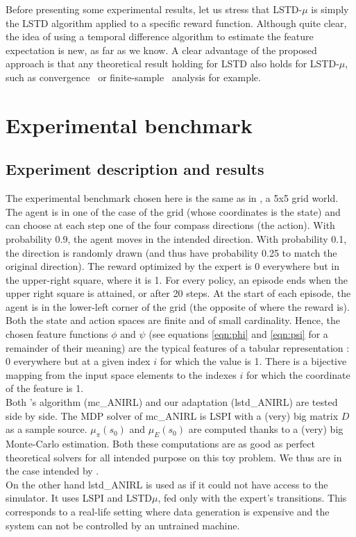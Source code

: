\documentclass{article}
\begin{document}
Before presenting some experimental results, let us stress that
LSTD-$\mu$ is simply the LSTD algorithm applied to a specific reward
function. Although quite clear, the idea of using a temporal
difference algorithm to estimate the feature expectation is new, as
far as we know. A clear advantage of the proposed approach is that
any theoretical result holding for LSTD also holds for LSTD-$\mu$,
such as convergence~\citep{nedic2003least} or
finite-sample~\citep{lazaric2010finiteLSTD} analysis for example.

\section{Experimental benchmark}
\label{sec:exp}
\subsection{Experiment description and results}
The experimental benchmark chosen here is the same as in \citep{ng2000algorithms}, a 5x5 grid world. The agent is in one of the case of the grid (whose coordinates is the state) and can choose at each step one of the four compass directions (the action). With probability 0.9, the agent moves in the intended direction. With probability 0.1, the direction is randomly drawn (and thus have probability 0.25 to match the original direction). The reward optimized by the expert is 0 everywhere but in the upper-right square, where it is 1. For every policy, an episode ends when the upper right square is attained, or after 20 steps. At the start of each episode, the agent is in the lower-left corner of the grid (the opposite of where the reward is).\\

Both the state and action spaces are finite and of small cardinality. Hence, the chosen feature functions $\phi$ and $\psi$ (see equations \ref{eqn:phi} and \ref{eqn:psi} for a remainder of their meaning) are the typical features of a tabular representation : 0 everywhere but at a given index $i$ for which the value is 1. There is a bijective mapping from the input space elements to the indexes $i$ for which the coordinate of the feature is 1.\\

Both \citet{abbeel2004apprenticeship}'s algorithm (mc\_ANIRL) and our adaptation (lstd\_ANIRL) are tested side by side. The MDP solver of mc\_ANIRL is LSPI with a (very) big matrix $D$ as a sample source. $\mu_\pi(s_0)$ and $\mu_E(s_0)$ are computed thanks to a (very) big Monte-Carlo estimation. Both these computations are  as good as perfect theoretical solvers for all intended purpose on this toy problem. We thus are in the case intended by \citet{abbeel2004apprenticeship}.\\
On the other hand lstd\_ANIRL is used as if it could not have access to the simulator. It uses LSPI and LSTD$\mu$, fed only with the expert's transitions. This corresponds to a real-life setting where data generation is expensive and the system can not be controlled by an untrained machine.\\
\end{document}
